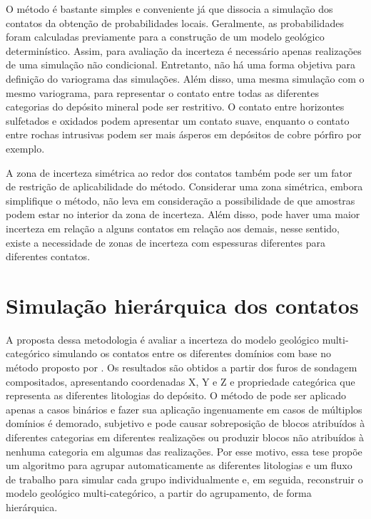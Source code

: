 O método é bastante simples e conveniente já que dissocia a simulação dos contatos da obtenção de probabilidades locais. Geralmente, as probabilidades foram calculadas previamente para a construção de um modelo geológico determinístico. Assim, para avaliação da incerteza é necessário apenas realizações de uma simulação não condicional. Entretanto, não há uma forma objetiva para definição do variograma das simulações. Além disso, uma mesma simulação com o mesmo variograma, para representar o contato entre todas as diferentes categorias do depósito mineral pode ser restritivo. O contato entre horizontes sulfetados e oxidados podem apresentar um contato suave, enquanto o contato entre rochas intrusivas podem ser mais ásperos em depósitos de cobre pórfiro por exemplo.

A zona de incerteza simétrica ao redor dos contatos também pode ser um fator de restrição de aplicabilidade do método. Considerar uma zona simétrica, embora simplifique o método, não leva em consideração a possibilidade de que amostras podem estar no interior da zona de incerteza. Além disso, pode haver uma maior incerteza em relação a alguns contatos em relação aos demais, nesse sentido, existe a necessidade de zonas de incerteza com espessuras diferentes para diferentes contatos.

\section{Simulação hierárquica dos contatos}\label{hier_bound_sim}

A proposta dessa metodologia é avaliar a incerteza do modelo geológico multi-categórico simulando os contatos entre os diferentes domínios com base no método proposto por . Os resultados são obtidos a partir dos furos de sondagem compositados, apresentando coordenadas X, Y e Z e propriedade categórica que representa as diferentes litologias do depósito. O método de  pode ser aplicado apenas a casos binários e fazer sua aplicação ingenuamente em casos de múltiplos domínios é demorado, subjetivo e pode causar sobreposição de blocos atribuídos à diferentes categorias em diferentes realizações ou produzir blocos não atribuídos à nenhuma categoria em algumas das realizações. Por esse motivo, essa tese propõe um algoritmo para agrupar automaticamente as diferentes litologias e um fluxo de trabalho para simular cada grupo individualmente e, em seguida, reconstruir o modelo geológico multi-categórico, a partir do agrupamento, de forma hierárquica. 

